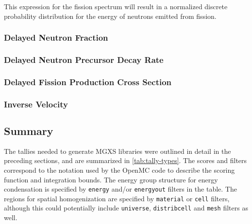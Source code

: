 \noindent This expression for the fission spectrum will result in a normalized discrete probability distribution for the energy of neutrons emitted from fission.

\subsubsection{Delayed Neutron Fraction}
\label{subsubsec:tally-types-beta}

\subsubsection{Delayed Neutron Precursor Decay Rate}
\label{subsubsec:tally-types-lambda}

\subsubsection{Delayed Fission Production Cross Section}
\label{subsubsec:tally-types-delay-fiss-prod}

\subsubsection{Inverse Velocity}
\label{subsubsec:tally-types-inv-vel}


\subsection{Summary}
\label{subsec:tally-types-summary}

The tallies needed to generate MGXS libraries were outlined in detail in the preceding sections, and are summarized in \autoref{tab:tally-types}. The scores and filters correspond to the notation used by the OpenMC code to describe the scoring function and integration bounds. The energy group structure for energy condensation is specified by \texttt{energy} and/or \texttt{energyout} filters in the table. The regions for spatial homogenization are specified by \texttt{material} or \texttt{cell} filters, although this could potentially include \texttt{universe}, \texttt{distribcell} and \texttt{mesh} filters as well.

